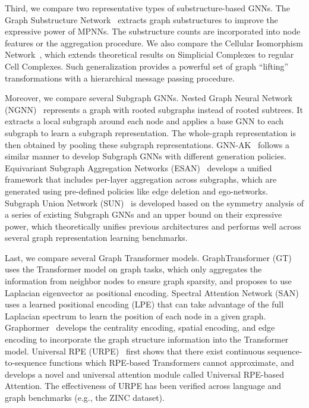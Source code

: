 \documentclass{article} %
\begin{document}
Third, we compare two representative types of substructure-based GNNs. The Graph Substructure Network~\citep{bouritsas2022improving} extracts graph substructures to improve the expressive power of MPNNs. The substructure counts are incorporated into node features or the aggregation procedure. We also compare the Cellular Isomorphism Network~\citep{bodnar2021cellular}, which extends theoretical results on Simplicial Complexes to regular Cell Complexes. Such generalization provides a powerful set of graph “lifting” transformations with a hierarchical message passing procedure.

Moreover, we compare several Subgraph GNNs. Nested Graph Neural Network (NGNN)~\citep{zhang2021nested} represents a graph with rooted subgraphs instead of rooted subtrees. It extracts a local subgraph around each node and applies a base GNN to each subgraph to learn a subgraph representation. The whole-graph representation is then obtained by pooling these subgraph representations. GNN-AK~\citep{zhao2022stars} follows a similar manner to develop Subgraph GNNs with different generation policies. Equivariant Subgraph Aggregation Networks (ESAN)~\citep{bevilacqua2022equivariant} develops a unified framework that includes per-layer aggregation across subgraphs, which are generated using pre-defined policies like edge deletion and ego-networks. Subgraph Union Network (SUN)~\citep{frasca2022Understanding} is developed based on the symmetry analysis of a series of existing Subgraph GNNs and an upper bound on their expressive power, which theoretically unifies previous architectures and performs well across several graph representation learning benchmarks.

Last, we compare several Graph Transformer models. GraphTransformer (GT)~\citep{dwivedi2021generalization} uses the Transformer model on graph tasks, which only aggregates the information from neighbor nodes to ensure graph sparsity, and proposes to use Laplacian eigenvector as positional encoding. Spectral Attention Network (SAN)~\citep{kreuzer2021rethinking} uses a learned positional encoding (LPE) that can take advantage of the full Laplacian spectrum to learn the position of each node in a given graph. Graphormer~\citep{ying2021transformers} develops the centrality encoding, spatial encoding, and edge encoding to incorporate the graph structure information into the Transformer model. Universal RPE (URPE)~\citep{luo2022your} first shows that there exist continuous sequence-to-sequence functions which RPE-based Transformers cannot approximate, and develops a novel and universal attention module called Universal RPE-based Attention. The effectiveness of URPE has been verified across language and graph benchmarks (e.g., the ZINC dataset).
\end{document}
